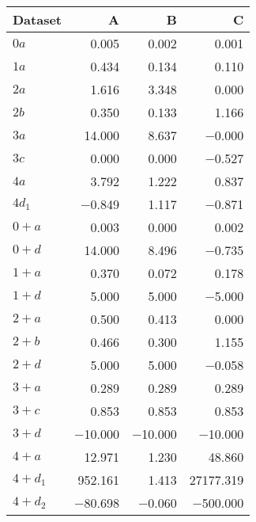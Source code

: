 \begin{tabular}{lrrr}
\toprule
 Dataset   &       A &       B &         C \\
\midrule
 $0 a$     &   \num{0.005} &   \num{0.002} &     \num{0.001} \\
 $1 a$     &   \num{0.434} &   \num{0.134} &     \num{0.110} \\
 $2 a$     &   \num{1.616} &   \num{3.348} &     \num{0.000} \\
 $2 b$     &   \num{0.350} &   \num{0.133} &     \num{1.166} \\
 $3 a$     &  \num{14.000} &   \num{8.637} &    \num{-0.000} \\
 $3 c$     &   \num{0.000} &   \num{0.000} &    \num{-0.527} \\
 $4 a$     &   \num{3.792} &   \num{1.222} &     \num{0.837} \\
 $4 d_1$   &  \num{-0.849} &   \num{1.117} &    \num{-0.871} \\
 $0+ a$    &   \num{0.003} &   \num{0.000} &     \num{0.002} \\
 $0+ d$    &  \num{14.000} &   \num{8.496} &    \num{-0.735} \\
 $1+ a$    &   \num{0.370} &   \num{0.072} &     \num{0.178} \\
 $1+ d$    &   \num{5.000} &   \num{5.000} &    \num{-5.000} \\
 $2+ a$    &   \num{0.500} &   \num{0.413} &     \num{0.000} \\
 $2+ b$    &   \num{0.466} &   \num{0.300} &     \num{1.155} \\
 $2+ d$    &   \num{5.000} &   \num{5.000} &    \num{-0.058} \\
 $3+ a$    &   \num{0.289} &   \num{0.289} &     \num{0.289} \\
 $3+ c$    &   \num{0.853} &   \num{0.853} &     \num{0.853} \\
 $3+ d$    & \num{-10.000} & \num{-10.000} &   \num{-10.000} \\
 $4+ a$    &  \num{12.971} &   \num{1.230} &    \num{48.860} \\
 $4+ d_1$  & \num{952.161} &   \num{1.413} & \num{27177.319} \\
 $4+ d_2$  & \num{-80.698} &  \num{-0.060} &  \num{-500.000} \\
\bottomrule
\end{tabular}